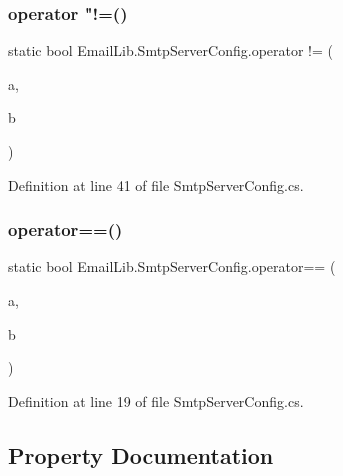 \subsubsection{\texorpdfstring{operator "!=()}{operator !=()}}
{\footnotesize\ttfamily static bool Email\+Lib.\+Smtp\+Server\+Config.\+operator != (\begin{DoxyParamCaption}\item[{\mbox{\hyperlink{classEmailLib_1_1SmtpServerConfig}{Smtp\+Server\+Config}}}]{a,  }\item[{\mbox{\hyperlink{classEmailLib_1_1SmtpServerConfig}{Smtp\+Server\+Config}}}]{b }\end{DoxyParamCaption})\hspace{0.3cm}{\ttfamily [static]}}



Definition at line 41 of file Smtp\+Server\+Config.\+cs.

\mbox{\label{classEmailLib_1_1SmtpServerConfig_aeecf6448a96895c4dc4593f927bd5a73}} 
\subsubsection{\texorpdfstring{operator==()}{operator==()}}
{\footnotesize\ttfamily static bool Email\+Lib.\+Smtp\+Server\+Config.\+operator== (\begin{DoxyParamCaption}\item[{\mbox{\hyperlink{classEmailLib_1_1SmtpServerConfig}{Smtp\+Server\+Config}}}]{a,  }\item[{\mbox{\hyperlink{classEmailLib_1_1SmtpServerConfig}{Smtp\+Server\+Config}}}]{b }\end{DoxyParamCaption})\hspace{0.3cm}{\ttfamily [static]}}



Definition at line 19 of file Smtp\+Server\+Config.\+cs.



\subsection{Property Documentation}
\mbox{\label{classEmailLib_1_1SmtpServerConfig_adbfdf67c5a1a7cdecc84526812c8858c}} 
